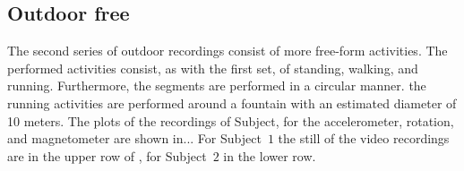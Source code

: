 
\subsection{Outdoor free}\label{subsec:outdoor_free}
The second series of outdoor recordings consist of more free-form activities.
The performed activities consist, as with the first set, of standing, walking, and running.
Furthermore, the segments are performed in a circular manner.
\eg the running activities are performed around a fountain with an estimated diameter of 10 meters.
The plots of the recordings of Subject, for the accelerometer, rotation, and magnetometer are shown in...
For Subject~$1$ the still of the video recordings are in the upper row of , for Subject~$2$ in the lower row.


